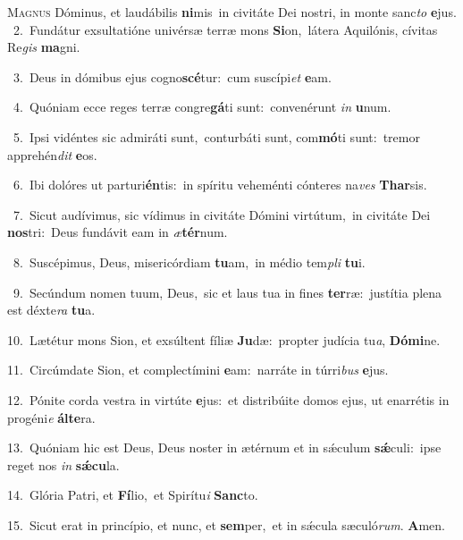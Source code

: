 \lettrine{\initial\textcolor{\initialcolor}{M}}{agnus} Dóminus, et laudábilis \textbf{ni}\-mis~\star in civitáte Dei nostri, in monte sanc\textit{to} \textbf{e}\-jus.\\
{\numbfont\textcolor{\numbcolor}{~2.}}~Fundátur exsultatióne univérsæ terræ mons \textbf{Si}\-on,~\star látera Aquilónis, cívitas Re\textit{gis} \textbf{ma}\-gni.\par
{\numbfont\textcolor{\numbcolor}{~3.}}~Deus in dómibus ejus cogno\-\textbf{scé}\-tur:~\star cum suscípi\textit{et} \textbf{e}\-am.\par
{\numbfont\textcolor{\numbcolor}{~4.}}~Quóniam ecce reges terræ congre\-\textbf{gá}\-ti sunt:~\star convenérunt \textit{in} \textbf{u}\-num.\par
{\numbfont\textcolor{\numbcolor}{~5.}}~Ipsi vidéntes sic admiráti sunt,~\dagger conturbáti sunt, com\-\textbf{mó}\-ti sunt:~\star tremor apprehén\textit{dit} \textbf{e}\-os.\par
{\numbfont\textcolor{\numbcolor}{~6.}}~Ibi dolóres ut parturi\-\textbf{én}\-tis:~\star in spíritu veheménti cónteres na\textit{ves} \textbf{Thar}\-sis.\par
{\numbfont\textcolor{\numbcolor}{~7.}}~Sicut audívimus, sic vídimus in civitáte Dómini virtútum,~\dagger in civitáte Dei \textbf{nos}\-tri:~\star Deus fundávit eam in \textit{æ}\-\textbf{tér}num.\par
{\numbfont\textcolor{\numbcolor}{~8.}}~Suscépimus, Deus, misericórdiam \textbf{tu}\-am,~\star in médio tem\textit{pli} \textbf{tu}\-i.\par
{\numbfont\textcolor{\numbcolor}{~9.}}~Secúndum nomen tuum, Deus,~\dagger sic et laus tua in fines \textbf{ter}\-ræ:~\star justítia plena est déxte\textit{ra} \textbf{tu}\-a.\par
{\numbfont\textcolor{\numbcolor}{10.}}~Lætétur mons Sion, et exsúltent fíliæ \textbf{Ju}\-dæ:~\star propter judícia tu\-\textit{a}\-, \textbf{Dó}\-\textbf{mi}ne.\par
{\numbfont\textcolor{\numbcolor}{11.}}~Circúmdate Sion, et complectímini \textbf{e}\-am:~\star narráte in túrri\textit{bus} \textbf{e}\-jus.\par
{\numbfont\textcolor{\numbcolor}{12.}}~Pónite corda vestra in virtúte \textbf{e}\-jus:~\star et distribúite domos ejus, ut enarrétis in progéni\textit{e} \textbf{ál}\-\textbf{te}ra.\par
{\numbfont\textcolor{\numbcolor}{13.}}~Quóniam hic est Deus, Deus noster in ætérnum et in sǽculum \textbf{sǽ}\-culi:~\star ipse reget nos \textit{in} \textbf{sǽ}\-\textbf{cu}la.\par
{\numbfont\textcolor{\numbcolor}{14.}}~Glória Patri, et \textbf{Fí}\-lio,~\star et Spirítu\textit{i} \textbf{Sanc}\-to.\par
{\numbfont\textcolor{\numbcolor}{15.}}~Sicut erat in princípio, et nunc, et \textbf{sem}\-per,~\star et in sǽcula sæculó\-\textit{rum}\-. \textbf{A}\-men.\par

